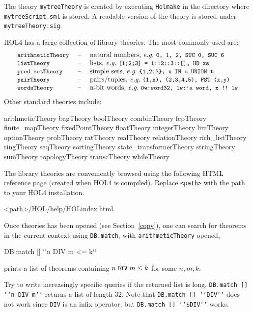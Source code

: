 \documentclass[a4paper,10pt]{article}
\begin{document}
The theory {\tt mytreeTheory} is created by executing {\tt Holmake} in
the directory where {\tt mytreeScript.sml} is stored. A
readable version of the theory is stored under {\tt mytreeTheory.sig}.


\newcommand{\itemx}[2]{\texttt{\small #1} &\;\textrm{--}\;& \textrm{#2} \\}

HOL4 has a large collection of library theories. The most commonly used are:
\begin{displaymath}
\begin{array}{lcl}
\itemx{arithmeticTheory}{natural numbers, \eg{} {\tt\small 0, 1, 2, SUC 0, SUC 6}}
\itemx{listTheory}{lists, \eg{} {\tt\small [1;2;3] = 1::2::3::[], HD xs}}
\itemx{pred\_setTheory}{simple sets,\ \eg{} {\tt\small \{1;2;3\}, x IN s UNION t}}
\itemx{pairTheory}{pairs/tuples,\ \eg{} {\tt\small (1,x), (2,3,4,5), FST (x,y)}}
\itemx{wordsTheory}{n-bit words,\ \eg{} {\tt\small 0w:word32, 1w:'a word, x {!!}~1w}}
\end{array}
\end{displaymath}
Other standard theories include:
\begin{code}
arithmeticTheory  bagTheory  boolTheory  combinTheory  fcpTheory
finite_mapTheory  fixedPointTheory  floatTheory  integerTheory
limTheory  optionTheory  probTheory  ratTheory  realTheory
relationTheory  rich_listTheory  ringTheory  seqTheory
sortingTheory  state_transformerTheory  stringTheory  sumTheory
topologyTheory  transcTheory  whileTheory
\end{code}
The library theories are conveniently browsed using the following HTML reference page (created when HOL4 is compiled).
Replace {\tt <path>} with the path to your HOL4 installation.
\begin{code}
<path>/HOL/help/HOLindex.html
\end{code}

Once theories has been opened (see Section~\ref{copy}), one can search for theorems in the current
context using {\tt DB.match}, \eg{} with {\tt arithmeticTheory} opened,
\begin{code}
DB.match [] {`}`n DIV m <= k{`}`
\end{code}
prints a list of theorems containing $n\; \texttt{\small DIV} \;m \leq k$ for some $n,m,k$:
\begin{code}
[(("arithmetic", "DIV_LE_MONOTONE"),
  (|- !n x y. 0 < n \conj{} x <= y ==> x DIV n <= y DIV n, Thm)),
 (("arithmetic", "DIV_LE_X"),
  (|- !x y z. 0 < z ==> (y DIV z <= x = y < (x + 1) * z), Thm)),
 (("arithmetic", "DIV_LESS_EQ"),
  (|- !n. 0 < n ==> !k. k DIV n <= k, Thm))]
\end{code}
Try to write increasingly specific queries if the returned list is long, \eg{}
{\tt\small DB.match [] {`}`n DIV m{`}`} returns a list of length 32. Note that {\tt\small DB.match [] {`}`DIV{`}`}
does not work since {\tt\small DIV} is an infix operator, but {\tt\small DB.match [] {`}`\$DIV{`}`} works.
\end{document}
